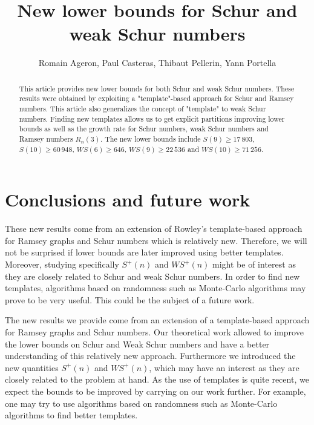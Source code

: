 \documentclass[3p]{elsarticle}
\title{New lower bounds for Schur and weak Schur numbers}
\author{Romain Ageron, Paul Casteras, Thibaut Pellerin, Yann Portella}
\newtheorem{computational theorem}[definition]{Computational Theorem}
\newcommand{\WS}{\mathit{WS}}
\begin{document}
\begin{abstract}

This article provides new lower bounds for both Schur and weak Schur numbers. These results were obtained by 
exploiting a "template"-based approach for Schur and Ramsey numbers. This article also generalizes the concept 
of "template" to weak Schur numbers. Finding new templates allows us to get explicit partitions improving lower bounds 
as well as the growth rate for Schur numbers, weak Schur numbers and Ramsey numbers \(R_n(3)\). The new lower 
bounds include \(S(9) \geqslant 17\,803\), \(S(10) \geqslant 60\,948\), \(\WS(6) \geqslant 646\), \(\WS (9) \geqslant 22\,536\) and 
\(\WS (10) \geqslant 71\,256 \).

\end{abstract}

\maketitle







\section{Conclusions and future work}

 These new results come from an extension of Rowley's template-based approach for Ramsey graphs and 
Schur numbers which is relatively new. Therefore, we will not be surprised if lower bounds are later improved 
using better templates. Moreover, studying specifically \(S^+(n)\) and \(\WS^+(n)\) might be of interest as they
 are closely related to Schur and weak Schur numbers. In order to find new templates, algorithms based on 
randomness such as Monte-Carlo algorithms may prove to be very useful. This could be the subject of a future work.

 The new results we provide come from an extension of a template-based approach for Ramsey graphs
and Schur numbers. Our theoretical work allowed to improve the lower bounds on Schur and Weak Schur numbers and have
a better understanding of this relatively new approach. Furthermore we introduced the new quantities \(S^+(n)\) and
\(\WS^+(n)\), which may have an interest as they are closely related to the problem at hand. As the use of templates
is quite recent, we expect the bounds to be improved by carrying on our work further. For example, one may try to use
algorithms based on randomness such as Monte-Carlo algorithms to find better templates.
\end{document}
